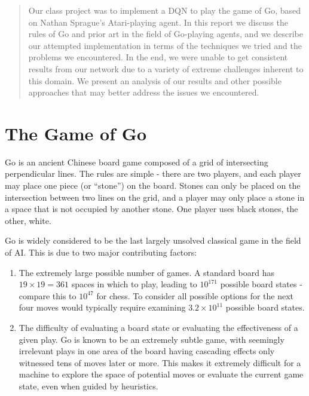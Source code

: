 
\begin{abstract}
Our class project was to implement a DQN to play the game of Go, based on Nathan Sprague's Atari-playing agent. In this report we discuss the rules of Go and prior art in the field of Go-playing agents, and we describe our attempted implementation in terms of the techniques we tried and the problems we encountered. In the end, we were unable to get consistent results from our network due to a variety of extreme challenges inherent to this domain. We present an analysis of our results and other possible approaches that may better address the issues we encountered.
\end{abstract}

\section{The Game of Go}

Go is an ancient Chinese board game composed of a grid of intersecting perpendicular lines. The rules are simple - there are two players, and each player may place one piece (or ``stone'') on the board. Stones can only be placed on the intersection between two lines on the grid, and a player may only place a stone in a space that is not occupied by another stone. One player uses black stones, the other, white.

Go is widely considered to be the last largely unsolved classical game in the field of AI. This is due to two major contributing factors:

\begin{enumerate}
\item The extremely large possible number of games. A standard board has $19\times 19=361$ spaces in which to play, leading to $10^{171}$ possible board states - compare this to $10^{47}$ for chess. To consider all possible options for the next four moves would typically require examining $3.2\times 10^{11}$ possible board states.
\item The difficulty of evaluating a board state or evaluating the effectiveness of a given play. Go is known to be an extremely subtle game, with seemingly irrelevant plays in one area of the board having cascading effects only witnessed tens of moves later or more. This makes it extremely difficult for a machine to explore the space of potential moves or evaluate the current game state, even when guided by heuristics.
\end{enumerate}

